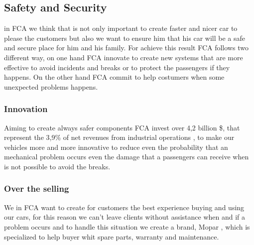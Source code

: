 \subsection{Safety and Security}
in FCA we think that is not only important to create faster and nicer car to please the customers but also we want to ensure him that his car will be a safe and secure place for him and his family. For achieve this result FCA follows two different way, on one hand FCA innovate to create new systems that are more effective to avoid incidents and breaks or to protect the passengers if they happens. On the other hand FCA commit to help costumers when some unexpected problems happens.

\subsubsection*{Innovation}
Aiming to create always safer components FCA invest over 4,2 billion \$, that represent the 3,9\% of net revenues from industrial operations \cite{FCASafety}, to make our vehicles more and more innovative to reduce even the probability that an mechanical problem occurs even the damage that a passengers can receive when is not possible to avoid the breaks.

\subsubsection{Over the selling}
We in FCA want to create for customers the best experience buying and using our cars, for this reason we can't leave clients without assistance when and if a problem occurs and to handle this situation we create a brand, Mopar \cite{Mopar}, which is specialized to help buyer whit spare parts, warranty and maintenance.



